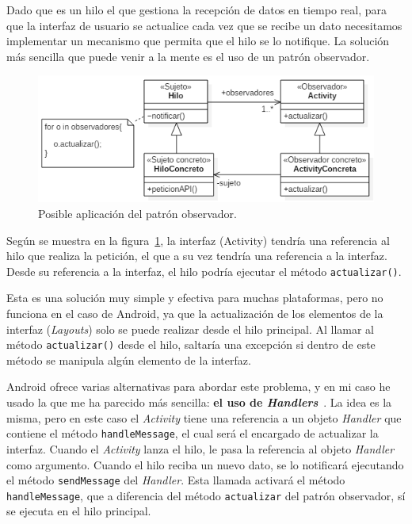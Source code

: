 Dado que es un hilo el que gestiona la recepción de datos en tiempo real, para que la interfaz de usuario se actualice cada vez que se recibe un dato necesitamos implementar un mecanismo que permita que el hilo se lo notifique. La solución más sencilla que puede venir a la mente es el uso de un patrón observador. 

\begin{figure}[H]
	\centering
	\includegraphics[width=1\textwidth]{../img/observador.png}
	\caption{Posible aplicación del patrón observador.}
	\label{fig:observador}
\end{figure}

Según se muestra en la figura~\ref{fig:observador}, la interfaz (Activity) tendría una referencia al hilo que realiza la petición, el que a su vez tendría una referencia a la interfaz. Desde su referencia a la interfaz, el hilo podría ejecutar el método \texttt{actualizar()}.

Esta es una solución muy simple y efectiva para muchas plataformas, pero no funciona en el caso de Android, ya que la actualización de los elementos de la interfaz (\textit{Layouts}) solo se puede realizar desde el hilo principal. Al llamar al método \texttt{actualizar()} desde el hilo, saltaría una excepción si dentro de este método se manipula algún elemento de la interfaz. 

Android ofrece varias alternativas para abordar este problema, y en mi caso he usado la que me ha parecido más sencilla: \textbf{el uso de \textit{Handlers}}~\cite{handler}. La idea es la misma, pero en este caso el \textit{Activity} tiene una referencia a un objeto \textit{Handler} que contiene el método \texttt{handleMessage}, el cual será el encargado de actualizar la interfaz. Cuando el \textit{Activity} lanza el hilo, le pasa la referencia al objeto \textit{Handler} como argumento. Cuando el hilo reciba un nuevo dato, se lo notificará ejecutando el método \texttt{sendMessage} del \textit{Handler}. Esta llamada activará el método \texttt{handleMessage}, que a diferencia del método \texttt{actualizar} del patrón observador, sí se ejecuta en el hilo principal. 

